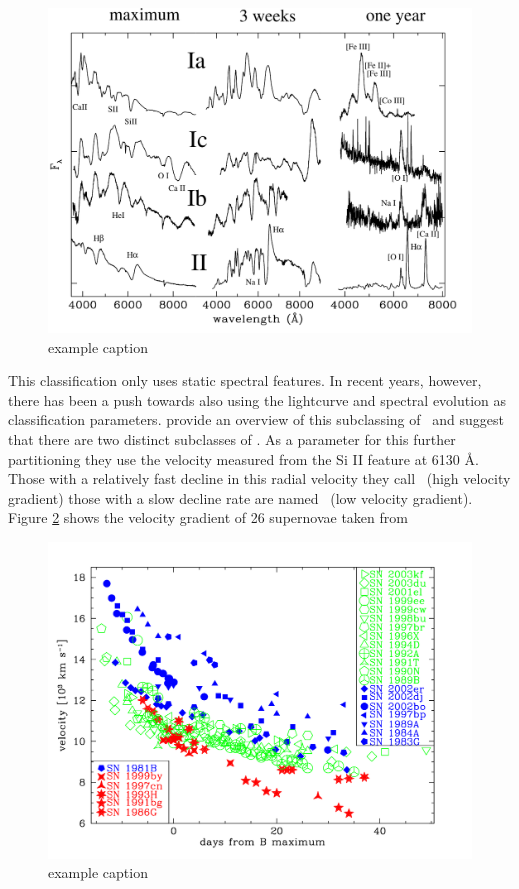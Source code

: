 \begin{figure}[htbp] %
   \centering
   \includegraphics[width=\textwidth]{chapter_intro/plots/sn_class_spectra.pdf} 
   \caption{example caption}
   \label{fig:sn_class_spectra}
\end{figure}

This classification only uses static spectral features. In recent years, however, there has been a push towards also using the lightcurve and spectral evolution as classification parameters. \citet{2005ApJ...623.1011B} provide an overview of this subclassing of \sneia\ and suggest that there are two distinct subclasses of \sneia. As a parameter for this further partitioning they use the velocity measured from the Si II feature at 6130 \AA. Those with a relatively fast decline in this radial velocity they call \hvg\ (high velocity gradient) those with a slow decline rate are named \lvg\ (low velocity gradient). 
Figure \ref{fig:sn_class_lvg_hvg} shows the velocity gradient of 26 supernovae taken from  \citet{2005ApJ...623.1011B}

\begin{figure}[htbp] %
   \centering
   \includegraphics[width=\textwidth]{chapter_intro/plots/velocity_gradient.pdf} 
   \caption{example caption}
   \label{fig:sn_class_lvg_hvg}
\end{figure}

